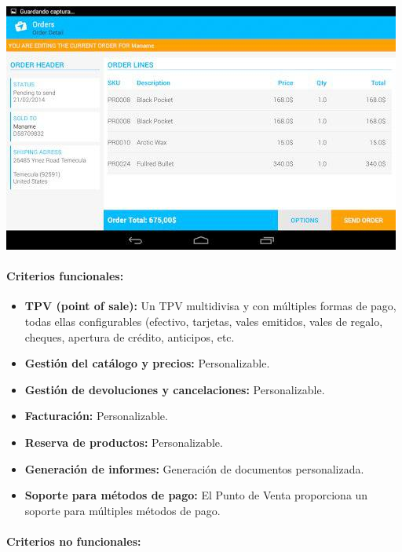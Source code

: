 \documentclass{article}
\begin{document}
\begin{flushleft}
	\includegraphics[scale=0.75]{imagenes/repcamp.jpg} 
\end{flushleft}

\paragraph{Criterios funcionales:}

\begin{itemize}

	\item \textbf{TPV (point of sale):} Un TPV multidivisa y con múltiples formas de pago, todas ellas configurables (efectivo, tarjetas, vales emitidos, vales de regalo, cheques, apertura de crédito, anticipos, etc.
	\item \textbf{Gestión del catálogo y precios:} Personalizable.
	\item \textbf{Gestión de devoluciones y cancelaciones:} Personalizable.
	\item \textbf{Facturación:} Personalizable.
	\item \textbf{Reserva de productos:} Personalizable.
	\item \textbf{Generación de informes:} Generación de documentos personalizada.
	\item \textbf{Soporte para métodos de pago:} El Punto de Venta proporciona un soporte para múltiples métodos de pago.

\end{itemize}

\paragraph{Criterios no funcionales:}
\end{document}
